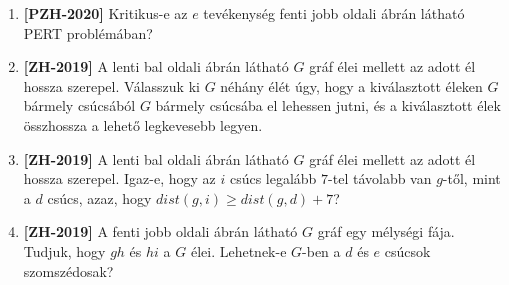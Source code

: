 \documentclass[a4paper, 12pt]{article}
\begin{document}
\begin{enumerate}
        \begin{figure}[!ht]
            \centering
            \hfill
            \hfill
            \hfill
            \hfill
        \end{figure}

        \item \textbf{[PZH-2020]} Kritikus-e az $e$ tevékenység fenti jobb oldali ábrán látható PERT problémában?
        
        \item \textbf{[ZH-2019]} A lenti bal oldali ábrán látható $G$ gráf élei mellett az adott él hossza szerepel. Válasszuk ki $G$ néhány élét úgy, hogy a kiválasztott éleken $G$ bármely csúcsából $G$ bármely csúcsába el lehessen jutni, és a kiválasztott élek összhossza a lehető legkevesebb legyen.
        \item \textbf{[ZH-2019]} A lenti bal oldali ábrán látható $G$ gráf élei mellett az adott él hossza szerepel. Igaz-e, hogy az $i$ csúcs legalább $7$-tel távolabb van $g$-től, mint a $d$ csúcs, azaz, hogy $dist(g, i) \geq dist(g, d) + 7$?
        \begin{figure}[!ht]
            \centering
            \hfill
            \hfill
            \hfill
            \hfill
        \end{figure}
        \item \textbf{[ZH-2019]} A fenti jobb oldali ábrán látható $G$ gráf egy mélységi fája. Tudjuk, hogy $gh$ és $hi$ a $G$ élei. Lehetnek-e $G$-ben a $d$ és $e$ csúcsok szomszédosak?
    \end{enumerate}
\end{document}
